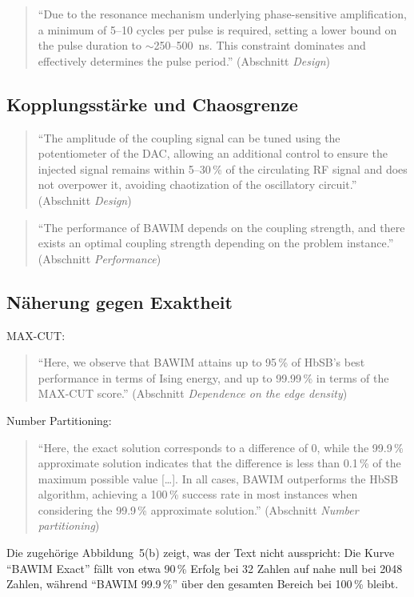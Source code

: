 \begin{quote}\QM
\enquote{Due to the resonance mechanism underlying phase-sensitive
amplification, a minimum of 5--10 cycles per pulse is required, setting a
lower bound on the pulse duration to $\sim$250--500~ns. This constraint
dominates and effectively determines the pulse period.}
(Abschnitt \emph{Design})
\end{quote}

\subsection{Kopplungsstärke und Chaosgrenze}

\begin{quote}\QM
\enquote{The amplitude of the coupling signal can be tuned using the
potentiometer of the DAC, allowing an additional control to ensure the
injected signal remains within 5--30\,\% of the circulating RF signal and
does not overpower it, avoiding chaotization of the oscillatory circuit.}
(Abschnitt \emph{Design})
\end{quote}
\begin{quote}\QM
\enquote{The performance of BAWIM depends on the coupling strength, and
there exists an optimal coupling strength depending on the problem
instance.} (Abschnitt \emph{Performance})
\end{quote}

\subsection{Näherung gegen Exaktheit}

MAX-CUT:
\begin{quote}\QM
\enquote{Here, we observe that BAWIM attains up to 95\,\% of HbSB's best
performance in terms of Ising energy, and up to 99.99\,\% in terms of the
MAX-CUT score.} (Abschnitt \emph{Dependence on the edge density})
\end{quote}
Number Partitioning:
\begin{quote}\QM
\enquote{Here, the exact solution corresponds to a difference of 0, while
the 99.9\,\% approximate solution indicates that the difference is less than
0.1\,\% of the maximum possible value [\ldots]. In all cases, BAWIM
outperforms the HbSB algorithm, achieving a 100\,\% success rate in most
instances when considering the 99.9\,\% approximate solution.}
(Abschnitt \emph{Number partitioning})
\end{quote}
Die zugehörige Abbildung~5(b) zeigt, was der Text nicht ausspricht: Die
Kurve \enquote{BAWIM Exact} fällt von etwa 90\,\% Erfolg bei 32 Zahlen auf
nahe null bei 2048 Zahlen, während \enquote{BAWIM 99.9\,\%} über den
gesamten Bereich bei 100\,\% bleibt.

